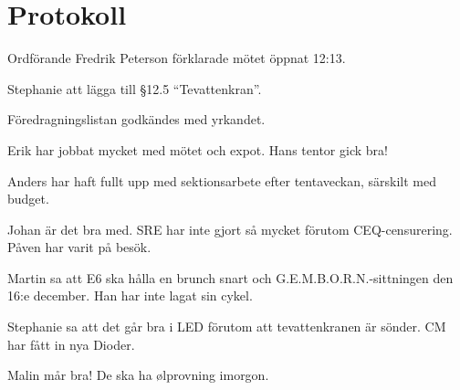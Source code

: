 \documentclass[10pt]{article}
\def\mo{Fredrik Peterson}
\begin{document}
\section*{Protokoll}
\begin{paragrafer}
Ordförande {\mo} förklarade mötet öppnat 12:13.

\valavmo%

\valavms%

\tosg%

\ingaadj%

\valavj%

Stephanie \ypa att lägga till \S12.5 ``Tevattenkran''.

Föredragningslistan godkändes med yrkandet.


\begin{fyllnadsval} %
\end{fyllnadsval}

\begin{paragrafer}
Erik har jobbat mycket med mötet och expot. Hans tentor gick bra!

Anders har haft fullt upp med sektionsarbete efter tentaveckan, särskilt med budget.

Johan är det bra med. SRE har inte gjort så mycket förutom CEQ-censurering. Påven har varit på besök.

Martin sa att E6 ska hålla en brunch snart och G.E.M.B.O.R.N.-sittningen den 16:e december. Han har inte lagat sin cykel.

Stephanie sa att det går bra i LED förutom att tevattenkranen är sönder. CM har fått in nya Dioder.

Malin mår bra! De ska ha ølprovning imorgon.


\end{paragrafer}
\end{paragrafer}
\end{document}
